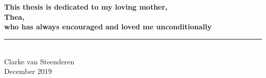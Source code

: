 \documentclass[12pt]{report}
\begin{document}
\chapter*{}

\textbf{\large{This thesis is dedicated to my loving mother, \\
Thea, \\
who has always encouraged and loved me unconditionally}} 



\begin{flushright}
\rule{5cm}{0.4pt} \\
Clarke van Steenderen \\
December 2019
\end{flushright}




\addtolength{\topmargin}{1cm}


\tableofcontents
\listoffigures
\listoftables
\newpage

\pagestyle{fancy}






\pagestyle{plain} %

\begin{singlespacing}

\end{singlespacing}




\end{document}
